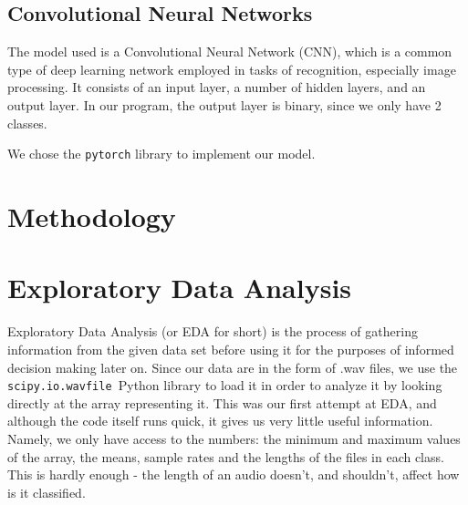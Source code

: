 \documentclass[11pt, letterpaper]{article}
\begin{document}
 \subsection{Convolutional Neural Networks}
 The model used is a Convolutional Neural Network (CNN), which is a common type of deep learning network employed in tasks of recognition, especially image processing. It consists of an input layer, a number of hidden layers, and an output layer. In our program, the output layer is binary, since we only have 2 classes.

 We chose the \verb|pytorch| library to implement our model.

\section{Methodology}
\section{Exploratory Data Analysis}

Exploratory Data Analysis (or EDA for short) is the process of gathering information from the given data set before using it for the purposes of informed decision making later on. Since our data are in the form of .wav files, we use the \verb | scipy.io.wavfile |Python library to load it in order to analyze it by looking directly at the array representing it. This was our first attempt at EDA, and although the code itself runs quick, it gives us very little useful information. Namely, we only have access to the numbers: the minimum and maximum values of the array, the means, sample rates and the lengths of the files in each class. This is hardly enough - the length of an audio doesn't, and shouldn't, affect how is it classified.
\end{document}
